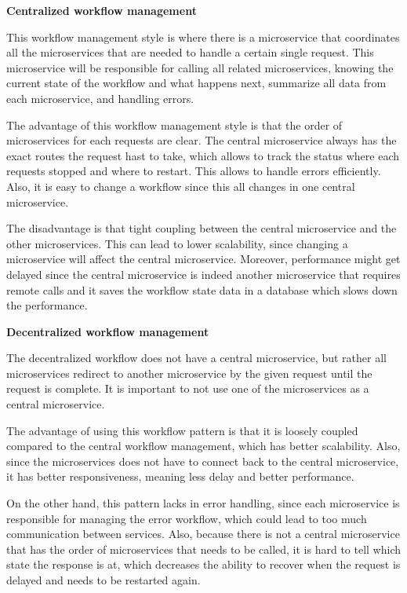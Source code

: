 \noindent \textbf{Centralized workflow management}

This workflow management style is where there is a microservice that coordinates all the microservices that are needed to handle a 
certain single request. This microservice will be responsible for calling all related microservices, knowing the current state of the 
workflow and what happens next, summarize all data from each microservice, and handling errors. 

The advantage of this workflow management style is that the order of microservices for each requests are clear. The central microservice always has the exact routes the request hast to take, which allows to track the status where each requests stopped and where to restart. This allows to handle errors efficiently. Also, it is easy to change a workflow since this all changes in one central microservice.

The disadvantage is that tight coupling between the central microservice and the other microservices. This can lead to lower scalability, since changing a microservice will affect the central microservice. Moreover, performance might get delayed since the central microservice is indeed another microservice that requires remote calls and it saves the workflow state data in a database which slows down the performance. 

\noindent \textbf{Decentralized workflow management}	

The decentralized workflow does not have a central microservice, but rather all microservices redirect to another microservice 
by the given request until the request is complete. It is important to not use one of the microservices as a central microservice.

The advantage of using this workflow pattern is that it is loosely coupled compared to the central workflow management, 
which has better scalability. Also, since the microservices does not have to connect back to the central microservice, 
it has better responsiveness, meaning less delay and better performance. 

On the other hand, this pattern lacks in error handling, since each microservice is responsible for managing the error workflow, 
which could lead to too much communication between services. Also, because there is not a central microservice that has the order 
of microservices that needs to be called, it is hard to tell which state the response is at, which decreases the ability to recover 
when the request is delayed and needs to be restarted again. 

